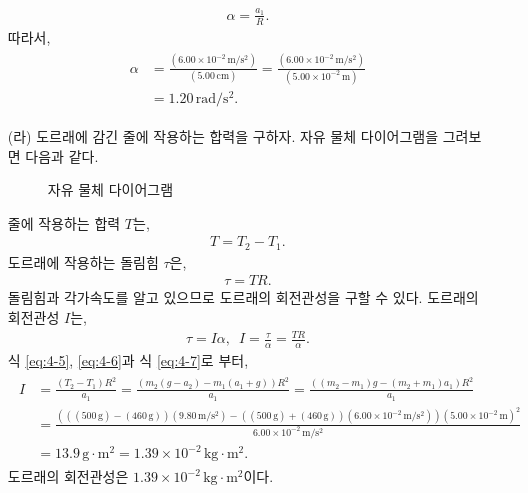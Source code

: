 \documentclass[floatfix,nofootinbib,superscriptaddress,fleqn]{revtex4-2}
\begin{document}
\begin{itemize}
\begin{align}
        \alpha=\frac{a_1}{R}.
    \end{align}
    따라서,
    \begin{align}
        \begin{split}
            \alpha&=\frac{(6.00\times 10^{-2}\,\mathrm{m/s^2})}
            {(5.00 \,\mathrm{cm})}
            = \frac{(6.00\times 10^{-2}\,\mathrm{m/s^2})}
            {(5.00\times 10^{-2} \,\mathrm{m})} \\
            &= 1.20\,\mathrm{rad/s^2}.
        \end{split}        
    \end{align}
    \item[(라)] 도르래에 감긴 줄에 작용하는 합력을 구하자. 자유 물체 다이어그램을 그려보면 다음과 같다.
    \begin{figure}[htp]
        \centering
        \caption{자유 물체 다이어그램}
    \end{figure}
    줄에 작용하는 합력 $T$는,
    \begin{align}\label{eq:4-7}
        T = T_2-T_1.
    \end{align}
    도르래에 작용하는 돌림힘 $\tau$은,
    \begin{align}
        \tau  = TR.
    \end{align}
    돌림힘과 각가속도를 알고 있으므로 도르래의 회전관성을 구할 수 있다. 도르래의 회전관성 $I$는,
    \begin{align}
        \tau = I\alpha,\,\,\, I=\frac{\tau}{\alpha}=\frac{TR}{\alpha}.
    \end{align}
    식 \eqref{eq:4-5}, \eqref{eq:4-6}과 식 \eqref{eq:4-7}로 부터,
    \begin{align}
        \begin{split}
            I &= \frac{(T_2-T_1)R^2}{a_1} =  \frac{(m_2\left( g-a_2 \right)
            -m_1\left( a_1+g \right))R^2}{a_1}  
            = \frac{((m_2-m_1)g-(m_2+m_1)a_1)R^2}{a_1} \\
            &=  \frac{(((500\,\mathrm{g})-(460\,\mathrm{g}))(9.80\,\mathrm{m/s^2})
            -((500\,\mathrm{g})+(460\,\mathrm{g}))
            (6.00\times 10^{-2}\,\mathrm{m/s^2}))(5.00\times 10^{-2}\,\mathrm{m})^2}
            {6.00\times 10^{-2}\,\mathrm{m/s^2}}    \\
            &= 13.9\,\mathrm{g\cdot m^2}=1.39\times 10^{-2}\,\mathrm{kg\cdot m^2}.
        \end{split}
    \end{align}
    도르래의 회전관성은 $1.39\times 10^{-2}\,\mathrm{kg\cdot m^2}$이다.
\end{itemize}
\end{document}
